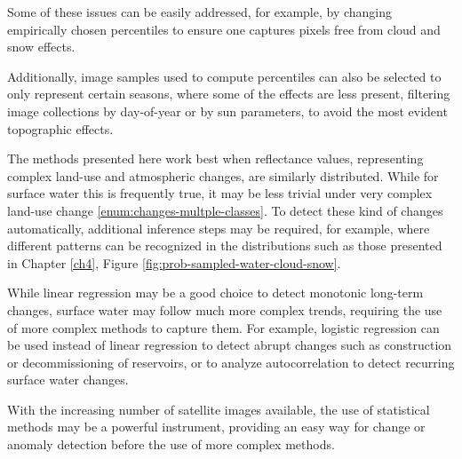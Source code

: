 Some of these issues can be easily addressed, for example, by changing empirically chosen percentiles to ensure one captures pixels free from cloud and snow effects.

Additionally, image samples used to compute percentiles can also be selected to only represent certain seasons, where some of the effects are less present, filtering image collections by day-of-year or by sun parameters, to avoid the most evident topographic effects. 

The methods presented here work best when reflectance values, representing complex land-use and atmospheric changes, are similarly distributed. While for surface water this is frequently true, it may be less trivial under very complex land-use change \ref{enum:changes-multple-classes}. To detect these kind of changes automatically, additional inference steps may be required, for example, where different patterns can be recognized in the distributions such as those presented in Chapter \ref{ch4}, Figure \ref{fig:prob-sampled-water-cloud-snow}.

While linear regression may be a good choice to detect monotonic long-term changes, surface water may follow much more complex trends, requiring the use of more complex methods to capture them. For example, logistic regression can be used instead of linear regression to detect abrupt changes such as construction or decommissioning of reservoirs, or to analyze autocorrelation to detect recurring surface water changes.

With the increasing number of satellite images available, the use of statistical methods may be a powerful instrument, providing an easy way for change or anomaly detection before the use of more complex methods.


